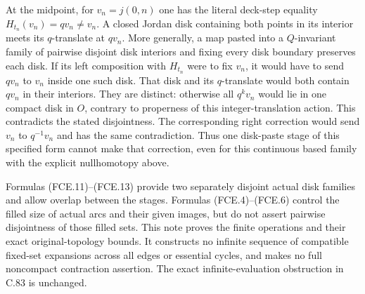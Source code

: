 \documentclass[11pt,a4paper]{article}
\begin{document}
At the midpoint, for $v_n=j(0,n)$ one has the literal
deck-step equality $H_{t_n}(v_n)=qv_n\ne v_n$.
A closed Jordan disk containing both points in its
interior meets its $q$-translate at $qv_n$.
More generally, a map pasted into a $Q$-invariant family
of pairwise disjoint disk interiors and fixing every
disk boundary preserves each disk. If its left
composition with $H_{t_n}$ were to fix $v_n$, it would
have to send $qv_n$ to $v_n$ inside one such disk.
That disk and its $q$-translate would both contain
$qv_n$ in their interiors. They are distinct: otherwise
all $q^kv_n$ would lie in one compact disk in $O$,
contrary to properness of this integer-translation action.
This contradicts the stated disjointness. The corresponding right correction would
send $v_n$ to $q^{-1}v_n$ and has the same contradiction.
Thus one disk-paste stage of this specified form cannot
make that correction, even for this continuous based
family with the explicit nullhomotopy above.

Formulas (FCE.11)--(FCE.13) provide two separately
disjoint actual disk families and allow overlap between
the stages. Formulas (FCE.4)--(FCE.6) control the filled
size of actual arcs and their given images, but do not
assert pairwise disjointness of those filled sets.
This note proves the finite operations and their exact
original-topology bounds. It constructs no infinite
sequence of compatible fixed-set expansions across all
edges or essential cycles, and makes no full noncompact
contraction assertion. The exact infinite-evaluation
obstruction in C.83 is unchanged.
\end{document}
